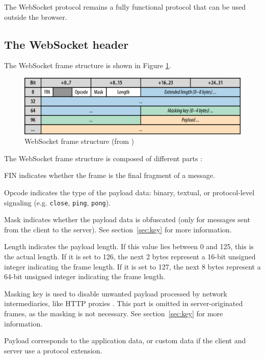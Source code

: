 \documentclass[10pt,journal,compsoc]{IEEEtran}
\newcommand{\ttt}[1]{\texttt{#1}}
\newcommand{\ws}{WebSocket}
\begin{document}
The \ws{} protocol remains a fully functional protocol that can be used outside the browser.

\subsection{The \ws{} header}
\label{sec:ws-header}
The \ws{} frame structure is shown in Figure \ref{fig:websocket_frame}.

\begin{figure}
    \centering
    \includegraphics[width=\linewidth]{websocket_frame.png}
    \caption{\ws{} frame structure (from \cite{HighPerfBrowserNetworking:websocket})}
    \label{fig:websocket_frame}
\end{figure}

The \ws{} frame structure is composed of different parts \cite{HighPerfBrowserNetworking:websocket} \cite{performanceEvaluationOfWebsocketProtocol} :
\begin{LaTeXdescription}    %
    \item[FIN] indicates whether the frame is the final fragment of a message. %
    \item[Opcode] indicates the type of the payload data: binary, textual, or protocol-level signaling (e.g. \ttt{close}, \ttt{ping}, \ttt{pong}).
    \item[Mask] indicates whether the payload data is obfuscated (only for messages sent from the client to the server). See section~\ref{sec:key} for more information.
    \item[Length] indicates the payload length. If this value lies between 0 and 125, this is the actual length.
                    If it is set to 126, the next 2 bytes represent a 16-bit unsigned integer indicating the frame length.
                    If it is set to 127, the next 8 bytes represent a 64-bit unsigned integer indicating the frame length.
    \item[Masking key] is used to disable unwanted payload processed by network intermediaries, like HTTP proxies \cite{performanceEvaluationOfWebsocketProtocol}.
                    This part is omitted in server-originated frames, as the masking is not necessary. See section~\ref{sec:key} for more information.
    \item[Payload] corresponds to the application data, or custom data if the client and server use a protocol extension.
\end{LaTeXdescription}
\end{document}
